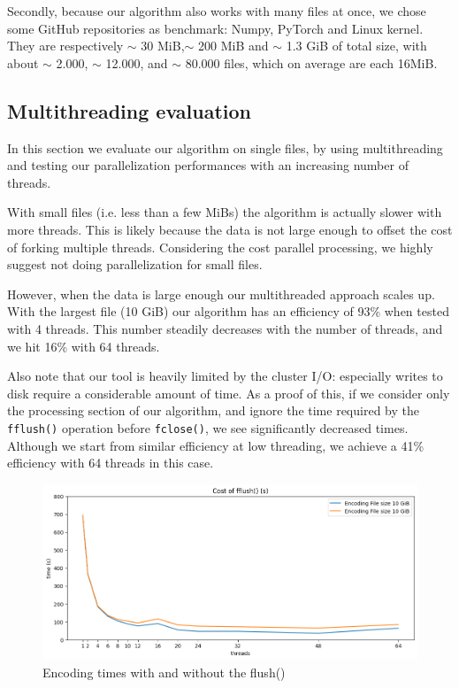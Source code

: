 Secondly, because our algorithm also works with many files at once, we chose some GitHub repositories as benchmark: Numpy, PyTorch and Linux kernel. They are respectively $\sim$ 30 MiB,$\sim$ 200 MiB and $\sim$ 1.3 GiB of total size, with about $\sim$ 2.000, $\sim$ 12.000, and  $\sim$ 80.000 files, which on average are each 16MiB.




\subsection{Multithreading evaluation}
In this section we evaluate our algorithm on single files, by using multithreading and testing our parallelization performances with an increasing number of threads.

With small files (i.e. less than a few MiBs) the algorithm is actually slower with more threads. This is likely because the data is not large enough to offset the cost of forking multiple threads. Considering the cost parallel processing, we highly suggest not doing parallelization for small files.

However, when the data is large enough our multithreaded approach scales up. With the largest file (10 GiB) our algorithm has an efficiency of 93\% when tested with 4 threads. This number steadily decreases with the number of threads, and we hit 16\% with 64 threads.

Also note that our tool is heavily limited by the cluster I/O: especially writes to disk require a considerable amount of time. As a proof of this, if we consider only the processing section of our algorithm, and ignore the time required by the \verb|fflush()| operation before \verb|fclose()|, we see significantly decreased times. Although we start from similar efficiency at low threading, we achieve a 41\% efficiency with 64 threads in this case. %

\begin{figure}
	\centering
	\includegraphics[width=1\linewidth]{"../imgs/Flush vs non Flush"}
	\caption{Encoding times with and without the flush()}
	\label{fig:flush-vs-non-flush}
\end{figure}

